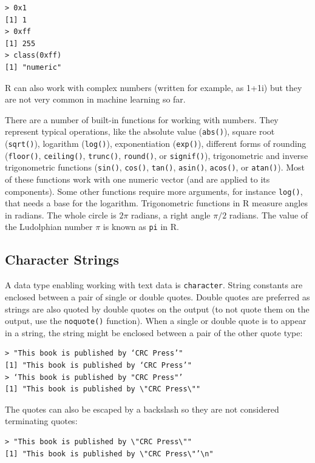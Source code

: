 \begin{verbatim}
> 0x1
[1] 1
> 0xff
[1] 255
> class(0xff)
[1] "numeric"
\end{verbatim}

R can also work with complex numbers (written for example, as 1+1i) but
they are not very common in machine learning so far.

There are a number of built-in functions for working with numbers. They
represent typical operations, like the absolute value (\texttt{abs()}), square root (\texttt{sqrt()}), logarithm (\texttt{log()}), exponentiation (\texttt{exp()}), different forms of rounding (\texttt{floor()}, \texttt{ceiling()}, \texttt{trunc()}, \texttt{round()}, or \texttt{signif()}), trigonometric
and inverse trigonometric functions (\texttt{sin()}, \texttt{cos()}, \texttt{tan()}, \texttt{asin()}, \texttt{acos()},
or \texttt{atan()}). Most of these functions work with one numeric vector (and are
applied to its components). Some other functions require more arguments, for
instance \texttt{log()}, that needs a base for the logarithm. Trigonometric functions in
R measure angles in radians. The whole circle is $2\pi$ radians, a right angle $\pi/2$
radians. The value of the Ludolphian number $\pi$ is known as \texttt{pi} in R.

\subsection{Character Strings}

A data type enabling working with text data is \texttt{character}. String constants are
enclosed between a pair of single or double quotes. Double quotes are preferred
as strings are also quoted by double quotes on the output (to not quote them on
the output, use the \texttt{noquote()} function). When a single or double quote is to
appear in a string, the string might be enclosed between a pair of the other quote
type:

\begin{verbatim}
> "This book is published by ‘CRC Press’"
[1] "This book is published by ‘CRC Press’"
> ‘This book is published by "CRC Press"’
[1] "This book is published by \"CRC Press\""
\end{verbatim}

The quotes can also be escaped by a backslash so they are not considered
terminating quotes:

\begin{verbatim}
> "This book is published by \"CRC Press\""
[1] "This book is published by \"CRC Press\"’\n"
\end{verbatim}

